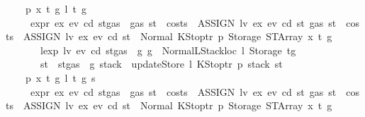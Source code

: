 \begin{isabellebody}
\ \ {\isacharbar}{\kern0pt}\ {\isacharparenleft}{\kern0pt}{}{}{\isacharparenright}{\kern0pt}\ p\ x\ t\ g\ l\ t{\isacharprime}{\kern0pt}\ g{\isacharprime}{\kern0pt}\isanewline
\ \ \ \ \ {\isachardoublequoteopen}expr\ ex\ ev\ cd\ {\isacharparenleft}{\kern0pt}st{\isasymlparr}gas\ {\isacharcolon}{\kern0pt}{\isacharequal}{\kern0pt}\ gas\ st\ {\isacharminus}{\kern0pt}\ costs\ \ {\isacharparenleft}{\kern0pt}ASSIGN\ lv\ ex{\isacharparenright}{\kern0pt}\ ev\ cd\ st{\isasymrparr}{\isacharparenright}{\kern0pt}\ {\isacharparenleft}{\kern0pt}gas\ st\ {\isacharminus}{\kern0pt}\ costs\ \ {\isacharparenleft}{\kern0pt}ASSIGN\ lv\ ex{\isacharparenright}{\kern0pt}\ ev\ cd\ st{\isacharparenright}{\kern0pt}\ {\isacharequal}{\kern0pt}\ Normal\ {\isacharparenleft}{\kern0pt}{\isacharparenleft}{\kern0pt}KStoptr\ p{\isacharcomma}{\kern0pt}\ Storage\ {\isacharparenleft}{\kern0pt}STArray\ x\ t{\isacharparenright}{\kern0pt}{\isacharparenright}{\kern0pt}{\isacharcomma}{\kern0pt}\ g{\isacharparenright}{\kern0pt}{\isachardoublequoteclose}\isanewline
\ \ \ \ \ \ \ {\isachardoublequoteopen}lexp\ lv\ ev\ cd\ {\isacharparenleft}{\kern0pt}st{\isasymlparr}gas\ {\isacharcolon}{\kern0pt}{\isacharequal}{\kern0pt}\ g{\isasymrparr}{\isacharparenright}{\kern0pt}\ g\ {\isacharequal}{\kern0pt}\ Normal{\isacharparenleft}{\kern0pt}{\isacharparenleft}{\kern0pt}LStackloc\ l{\isacharcomma}{\kern0pt}\ Storage\ t{\isacharprime}{\kern0pt}{\isacharparenright}{\kern0pt}{\isacharcomma}{\kern0pt}g{\isacharprime}{\kern0pt}{\isacharparenright}{\kern0pt}{\isachardoublequoteclose}\isanewline
\ \ \ \ \ \ \ {\isachardoublequoteopen}st{\isacharprime}{\kern0pt}\ {\isacharequal}{\kern0pt}\ st{\isasymlparr}gas\ {\isacharcolon}{\kern0pt}{\isacharequal}{\kern0pt}\ g{\isacharprime}{\kern0pt}{\isacharcomma}{\kern0pt}\ stack\ {\isacharcolon}{\kern0pt}{\isacharequal}{\kern0pt}\ updateStore\ l\ {\isacharparenleft}{\kern0pt}KStoptr\ p{\isacharparenright}{\kern0pt}\ {\isacharparenleft}{\kern0pt}stack\ st{\isacharparenright}{\kern0pt}{\isasymrparr}{\isachardoublequoteclose}\isanewline
\ \ {\isacharbar}{\kern0pt}\ {\isacharparenleft}{\kern0pt}{}{}{\isacharparenright}{\kern0pt}\ p\ x\ t\ g\ l\ t{\isacharprime}{\kern0pt}\ g{\isacharprime}{\kern0pt}\ s\isanewline
\ \ \ \ \ {\isachardoublequoteopen}expr\ ex\ ev\ cd\ {\isacharparenleft}{\kern0pt}st{\isasymlparr}gas\ {\isacharcolon}{\kern0pt}{\isacharequal}{\kern0pt}\ gas\ st\ {\isacharminus}{\kern0pt}\ costs\ \ {\isacharparenleft}{\kern0pt}ASSIGN\ lv\ ex{\isacharparenright}{\kern0pt}\ ev\ cd\ st{\isasymrparr}{\isacharparenright}{\kern0pt}\ {\isacharparenleft}{\kern0pt}gas\ st\ {\isacharminus}{\kern0pt}\ costs\ \ {\isacharparenleft}{\kern0pt}ASSIGN\ lv\ ex{\isacharparenright}{\kern0pt}\ ev\ cd\ st{\isacharparenright}{\kern0pt}\ {\isacharequal}{\kern0pt}\ Normal\ {\isacharparenleft}{\kern0pt}{\isacharparenleft}{\kern0pt}KStoptr\ p{\isacharcomma}{\kern0pt}\ Storage\ {\isacharparenleft}{\kern0pt}STArray\ x\ t{\isacharparenright}{\kern0pt}{\isacharparenright}{\kern0pt}{\isacharcomma}{\kern0pt}\ g{\isacharparenright}{\kern0pt}{\isachardoublequoteclose}\isanewline

\end{isabellebody}
